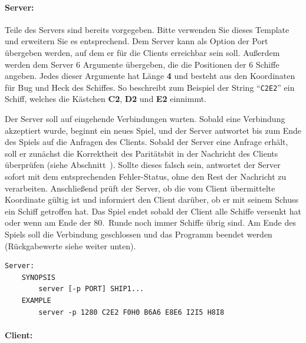 \paragraph{Server:}
Teile des Servers sind bereits vorgegeben. Bitte verwenden Sie dieses Template
und erweitern Sie es entsprechend.  Dem Server kann als Option der Port
übergeben werden, auf dem er für die Clients erreichbar sein soll.
Außerdem werden dem Server 6 Argumente übergeben, die die Positionen der 6 Schiffe angeben.
Jedes dieser Argumente hat Länge \textbf{4} und besteht aus den Koordinaten für Bug und Heck des Schiffes.
So beschreibt zum Beispiel der String ``\verb|C2E2|''
ein Schiff, welches die Kästchen \textbf{C2}, \textbf{D2} und \textbf{E2} einnimmt.

Der Server soll auf eingehende Verbindungen warten. Sobald eine Verbindung
akzeptiert wurde, beginnt ein neues Spiel, und der Server antwortet bis zum
Ende des Spiels auf die Anfragen des Clients.
Sobald der Server eine Anfrage erhält, soll er zunächst die Korrektheit des Paritätsbit in der Nachricht des Clients
überprüfen (siehe Abschnitt~).
Sollte dieses falsch sein, antwortet der Server sofort mit dem entsprechenden Fehler-Status,
ohne den Rest der Nachricht zu verarbeiten.
Anschließend prüft der Server, ob die vom Client übermittelte Koordinate gültig ist
und informiert den Client darüber, ob er mit seinem Schuss ein Schiff getroffen hat.
Das Spiel endet sobald der Client alle Schiffe versenkt hat
oder wenn am Ende der 80.\ Runde noch immer Schiffe übrig sind.
Am Ende des Spiels soll die Verbindung geschlossen und das Programm beendet werden
(Rückgabewerte siehe weiter unten).


\vspace{-10pt}
\begin{verbatim}
Server:
    SYNOPSIS
        server [-p PORT] SHIP1...
    EXAMPLE
        server -p 1280 C2E2 F0H0 B6A6 E8E6 I2I5 H8I8
\end{verbatim}

\paragraph{Client:}

